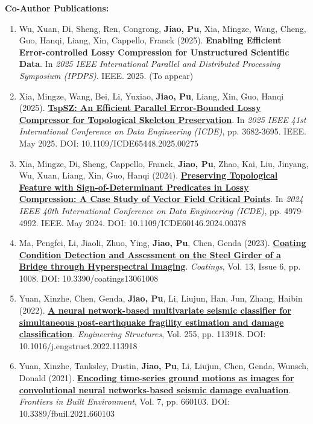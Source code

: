 \documentclass[a4paper,11pt]{article}
\begin{document}
\textbf{Co-Author Publications:}
\small{
\begin{enumerate}[leftmargin=*, labelsep=0.5em, resume]
\item Wu, Xuan, Di, Sheng, Ren, Congrong, \textbf{Jiao, Pu}, Xia, Mingze, Wang, Cheng, Guo, Hanqi, Liang, Xin, Cappello, Franck (2025). \textbf{Enabling Efficient Error-controlled Lossy Compression for Unstructured Scientific Data}. In \textit{2025 IEEE International Parallel and Distributed Processing Symposium (IPDPS)}. IEEE. 2025. (To appear)

\item Xia, Mingze, Wang, Bei, Li, Yuxiao, \textbf{Jiao, Pu}, Liang, Xin, Guo, Hanqi (2025). \href{https://doi.ieeecomputersociety.org/10.1109/ICDE65448.2025.00275}{\textbf{TspSZ: An Efficient Parallel Error-Bounded Lossy Compressor for Topological Skeleton Preservation}}. In \textit{2025 IEEE 41st International Conference on Data Engineering (ICDE)}, pp. 3682-3695. IEEE. May 2025. DOI: 10.1109/ICDE65448.2025.00275

\item Xia, Mingze, Di, Sheng, Cappello, Franck, \textbf{Jiao, Pu}, Zhao, Kai, Liu, Jinyang, Wu, Xuan, Liang, Xin, Guo, Hanqi (2024). \href{https://doi.org/10.1109/ICDE60146.2024.00378}{\textbf{Preserving Topological Feature with Sign-of-Determinant Predicates in Lossy Compression: A Case Study of Vector Field Critical Points}}. In \textit{2024 IEEE 40th International Conference on Data Engineering (ICDE)}, pp. 4979-4992. IEEE. May 2024. DOI: 10.1109/ICDE60146.2024.00378

\item Ma, Pengfei, Li, Jiaoli, Zhuo, Ying, \textbf{Jiao, Pu}, Chen, Genda (2023). \href{https://doi.org/10.3390/coatings13061008}{\textbf{Coating Condition Detection and Assessment on the Steel Girder of a Bridge through Hyperspectral Imaging}}. \textit{Coatings}, Vol. 13, Issue 6, pp. 1008. DOI: 10.3390/coatings13061008

\item Yuan, Xinzhe, Chen, Genda, \textbf{Jiao, Pu}, Li, Liujun, Han, Jun, Zhang, Haibin (2022). \href{https://doi.org/10.1016/j.engstruct.2022.113918}{\textbf{A neural network-based multivariate seismic classifier for simultaneous post-earthquake fragility estimation and damage classification}}. \textit{Engineering Structures}, Vol. 255, pp. 113918. DOI: 10.1016/j.engstruct.2022.113918

\item Yuan, Xinzhe, Tanksley, Dustin, \textbf{Jiao, Pu}, Li, Liujun, Chen, Genda, Wunsch, Donald (2021). \href{https://doi.org/10.3389/fbuil.2021.660103}{\textbf{Encoding time-series ground motions as images for convolutional neural networks-based seismic damage evaluation}}. \textit{Frontiers in Built Environment}, Vol. 7, pp. 660103. DOI: 10.3389/fbuil.2021.660103
\end{enumerate}
}
\end{document}
